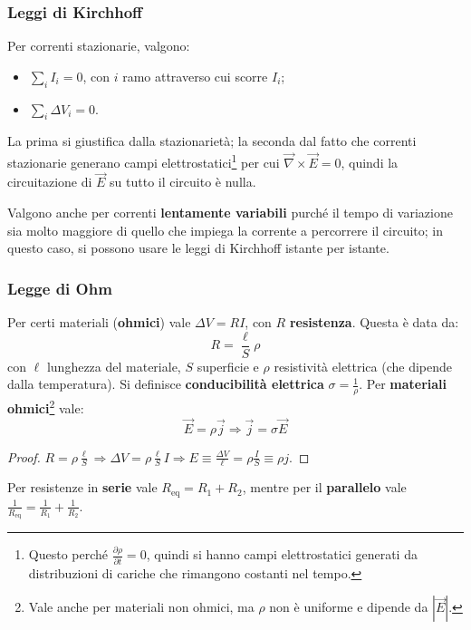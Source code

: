\documentclass[10pt, a4paper]{scrartcl}
\numberwithin{equation}{subsection}
\theoremstyle{style1}
\newenvironment{boxenv}[1][]{
    \begin{eqbox}[#1]
    }{
   \end{eqbox}
}
\begin{document}
\subsubsection{Leggi di Kirchhoff}
Per correnti stazionarie, valgono:
\begin{itemize}
	\item $\sum_{i}^{} I_i = 0$, con $i$ ramo attraverso cui scorre $I_i$;
	\item $\sum_{i}^{} \Delta V_i = 0$.
\end{itemize}
La prima si giustifica dalla stazionariet\`a; la seconda dal fatto che correnti stazionarie generano campi elettrostatici\footnote{Questo perch\'e $\frac{\partial \rho }{\partial t} = 0 $, quindi si hanno campi elettrostatici generati da distribuzioni di cariche che rimangono costanti nel tempo.} per cui $\vec{\nabla }\times \vec{E}=0$, quindi la circuitazione di $\vec{E}$ su tutto il circuito \`e nulla.

Valgono anche per correnti \textbf{lentamente variabili} purch\'e il tempo di variazione sia molto maggiore di quello che impiega la corrente a percorrere il circuito; in questo caso, si possono usare le leggi di Kirchhoff istante per istante.

\subsubsection{Legge di Ohm}

Per certi materiali (\textbf{ohmici}) vale $\Delta V = R I$, con $R$ \textbf{resistenza}. Questa \`e data da:
\begin{equation}
	R = \frac{\ell }{S} \rho 
\end{equation}
con $\ell $ lunghezza del materiale, $S$ superficie e $\rho $ resistivit\`a elettrica (che dipende dalla temperatura). Si definisce \textbf{conducibilit\`a elettrica} $\sigma  = \frac{1}{\rho }$. Per \textbf{materiali ohmici}\footnote{Vale anche per materiali non ohmici, ma $\rho $ non \`e uniforme e dipende da $\left\lvert \vec{E} \right\rvert $.} vale:
\begin{equation}
	\vec{E} = \rho  \vec{j} \Rightarrow \vec{j} = \sigma  \vec{E}
\end{equation}
\begin{boxenv}[]
\begin{proof}
	$R= \rho  \frac{\ell }{S}\Rightarrow \Delta V = \rho  \frac{\ell }{S}I\Rightarrow E \equiv \frac{\Delta V}{\ell }= \rho \frac{I}{S}\equiv \rho  j$.  
\end{proof}
\end{boxenv}
\noindent Per resistenze in \textbf{serie} vale $R_\text{eq} = R_1+R_2$, mentre per il \textbf{parallelo} vale $\frac{1}{R_\text{eq} }= \frac{1}{R_1}+\frac{1}{R_2}$.
\end{document}
